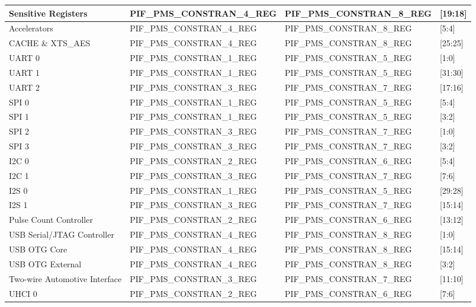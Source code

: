 \documentclass[main\_\_CN.tex]{subfiles}
\begin{document}
\begin{ThreePartTable}
\begin{longtable}[c]{ |l|l|l|l| }
    Sensitive Registers & PIF\_PMS\_CONSTRAN\_4\_REG & PIF\_PMS\_CONSTRAN\_8\_REG & [19:18] \\\hline
    Accelerators\tnote{1} & PIF\_PMS\_CONSTRAN\_4\_REG & PIF\_PMS\_CONSTRAN\_8\_REG & [5:4] \\\hline
    CACHE \& XTS\_AES\tnote{2} & PIF\_PMS\_CONSTRAN\_4\_REG & PIF\_PMS\_CONSTRAN\_8\_REG & [25:25] \\\hline
    UART 0 & PIF\_PMS\_CONSTRAN\_1\_REG & PIF\_PMS\_CONSTRAN\_5\_REG & [1:0] \\\hline
    UART 1 & PIF\_PMS\_CONSTRAN\_1\_REG & PIF\_PMS\_CONSTRAN\_5\_REG & [31:30] \\\hline
    UART 2 & PIF\_PMS\_CONSTRAN\_3\_REG & PIF\_PMS\_CONSTRAN\_7\_REG & [17:16] \\\hline
    SPI 0 & PIF\_PMS\_CONSTRAN\_1\_REG & PIF\_PMS\_CONSTRAN\_5\_REG & [5:4] \\\hline
    SPI 1 & PIF\_PMS\_CONSTRAN\_1\_REG & PIF\_PMS\_CONSTRAN\_5\_REG & [3:2] \\\hline
    SPI 2 & PIF\_PMS\_CONSTRAN\_3\_REG & PIF\_PMS\_CONSTRAN\_7\_REG & [1:0] \\\hline
    SPI 3 & PIF\_PMS\_CONSTRAN\_3\_REG & PIF\_PMS\_CONSTRAN\_7\_REG & [3:2] \\\hline
    I2C 0 & PIF\_PMS\_CONSTRAN\_2\_REG & PIF\_PMS\_CONSTRAN\_6\_REG & [5:4] \\\hline
    I2C 1 & PIF\_PMS\_CONSTRAN\_3\_REG & PIF\_PMS\_CONSTRAN\_7\_REG & [7:6] \\\hline
    I2S 0 & PIF\_PMS\_CONSTRAN\_1\_REG & PIF\_PMS\_CONSTRAN\_5\_REG & [29:28] \\\hline
    I2S 1 & PIF\_PMS\_CONSTRAN\_3\_REG & PIF\_PMS\_CONSTRAN\_7\_REG & [15:14] \\\hline
    Pulse Count Controller & PIF\_PMS\_CONSTRAN\_2\_REG & PIF\_PMS\_CONSTRAN\_6\_REG & [13:12] \\\hline
    USB Serial/JTAG Controller & PIF\_PMS\_CONSTRAN\_4\_REG & PIF\_PMS\_CONSTRAN\_8\_REG & [1:0] \\\hline
    USB OTG Core & PIF\_PMS\_CONSTRAN\_4\_REG & PIF\_PMS\_CONSTRAN\_8\_REG & [15:14] \\\hline
    USB OTG External & PIF\_PMS\_CONSTRAN\_4\_REG & PIF\_PMS\_CONSTRAN\_8\_REG & [3:2] \\\hline
    Two-wire Automotive Interface & PIF\_PMS\_CONSTRAN\_3\_REG & PIF\_PMS\_CONSTRAN\_7\_REG & [11:10] \\\hline
    UHCI 0  & PIF\_PMS\_CONSTRAN\_2\_REG & PIF\_PMS\_CONSTRAN\_6\_REG & [7:6] \\\hline

\end{longtable}
\end{ThreePartTable}
\end{document}
